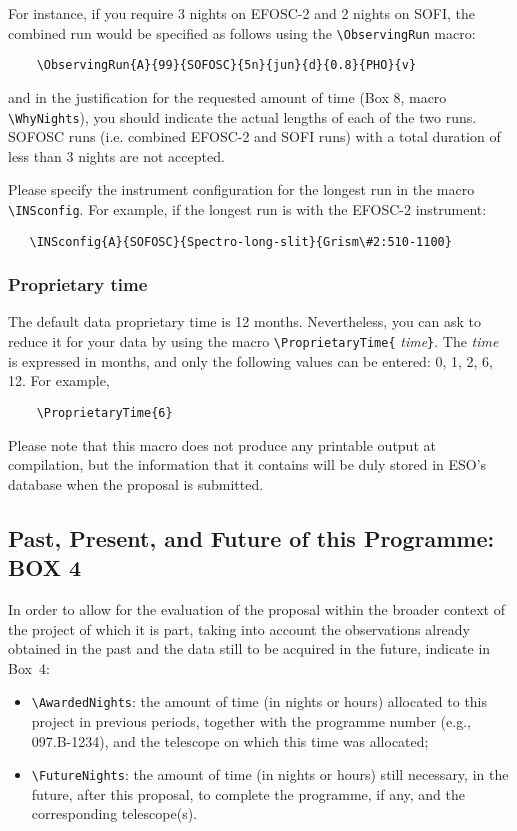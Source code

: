 \documentclass{article}
\begin{document}
For instance, if you require 3 nights on EFOSC-2 and 2 nights on SOFI, the
combined run would be specified as follows using the \verb|\ObservingRun|
 macro:
\begin{verbatim}
    \ObservingRun{A}{99}{SOFOSC}{5n}{jun}{d}{0.8}{PHO}{v}
\end{verbatim}

and in the justification for the requested amount of time
(Box 8, macro \verb|\WhyNights|), you should indicate the actual
lengths of each of the two runs. 
SOFOSC runs (i.e. combined EFOSC-2 and SOFI runs)  with a
total duration of less than 3 nights are not accepted.

Please specify the instrument configuration for the longest run
in the macro \verb|\INSconfig|. For example, if the longest run
is with the EFOSC-2 instrument:
\begin{verbatim}
   \INSconfig{A}{SOFOSC}{Spectro-long-slit}{Grism\#2:510-1100}
\end{verbatim}

\subsubsection*{Proprietary time} 
The default data proprietary time is 12 months.  Nevertheless, you can
ask to reduce it for 
your data by using the macro \verb|\ProprietaryTime{|{\it
    time\/}\verb|}|.  The {\it time\/} is expressed in months, and
only the following values can be entered:  0, 1, 2, 6, 12.  For
example, 
\begin{verbatim}
    \ProprietaryTime{6}
\end{verbatim}

Please note that this macro does not produce any printable output at
compilation, but the information that it contains will be duly stored
in ESO's database when the proposal is submitted.

\subsection{Past, Present, and Future of this Programme:  {\bf BOX 4}}

In order to allow for the evaluation of the proposal within the
broader context of the project of which it is part, taking into
account the observations already obtained in the past and the data
still to be acquired in the future, indicate in Box~4:
\begin{itemize}
\item \verb|\AwardedNights|: the amount of time (in nights or hours)
  allocated to this project in previous periods, together with the
  programme number (e.g., 097.B-1234), and the telescope
  on which this time was allocated;
\item \verb|\FutureNights|: the amount of time (in nights or hours)
  still necessary, in the future, after this proposal, to complete the
  programme, if any, and the corresponding telescope(s). 
\end{itemize}
\end{document}
